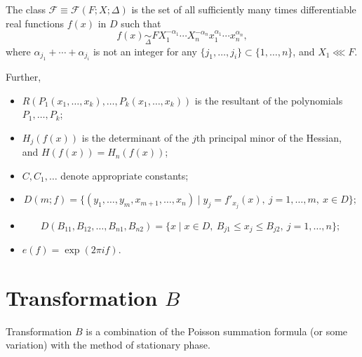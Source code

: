\documentclass[10pt]{article}
\begin{document}
The class $\mathscr F\equiv\mathscr F(F;X;\Delta)$ is the set of all sufficiently many times differentiable real functions $f(x)$ in $D$ such that
\[
  f(x)\underset{\Delta}{\sim}
  FX_1^{-\alpha_1}\cdots X_n^{-\alpha_n}x_1^{\alpha_1}\cdots x_n^{\alpha_n},
\]
where $\alpha_{j_1}+\cdots+\alpha_{j_i}$ is not an integer for any
$\{j_1,\ldots,j_i\}\subset\{1,\ldots,n\}$, and $X_1\lll F$.

Further,
\begin{itemize}
  \item $R(P_1(x_1,\ldots,x_k),\ldots,P_k(x_1,\ldots,x_k))$ is the resultant of the polynomials $P_1,\ldots,P_k$;
  \item $H_j(f(x))$ is the determinant of the $j$th principal minor of the Hessian, and $H(f(x))=H_n(f(x))$;
  \item $C,C_1,\ldots$ denote appropriate constants;
  \item
  \[
    D(m;f)=\{(y_1,\ldots,y_m,x_{m+1},\ldots,x_n)
      \mid y_j=f'_{x_j}(x),\ j=1,\ldots,m,\ x\in D\};
  \]
  \item
  \[
    D(B_{11},B_{12},\ldots,B_{n1},B_{n2})
    =\{x\mid x\in D,\ B_{j1}\leqslant x_j\leqslant B_{j2},\ j=1,\ldots,n\};
  \]
  \item $e(f)=\exp(2\pi i f)$.
\end{itemize}

\section{Transformation $B$}

Transformation $B$ is a combination of the Poisson summation formula (or some variation) with the method of stationary phase.
\end{document}
